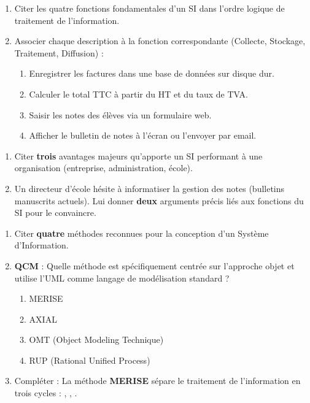 \documentclass[11pt]{article}
\begin{document}
\begin{exercice}[Fonctions d'un SI]
\begin{enumerate}
    \item Citer les quatre fonctions fondamentales d'un SI dans l'ordre logique de traitement de l'information.
    \item Associer chaque description à la fonction correspondante (Collecte, Stockage, Traitement, Diffusion) :
    \begin{enumerate}
        \item Enregistrer les factures dans une base de données sur disque dur.
        \item Calculer le total TTC à partir du HT et du taux de TVA.
        \item Saisir les notes des élèves via un formulaire web.
        \item Afficher le bulletin de notes à l'écran ou l'envoyer par email.
    \end{enumerate}
\end{enumerate}
\end{exercice}

\begin{exercice}[Intérêts d'un SI]
\begin{enumerate}
    \item Citer \textbf{trois} avantages majeurs qu'apporte un SI performant à une organisation (entreprise, administration, école).
    \item Un directeur d'école hésite à informatiser la gestion des notes (bulletins manuscrits actuels). Lui donner \textbf{deux} arguments précis liés aux fonctions du SI pour le convaincre.
\end{enumerate}
\end{exercice}

\begin{exercice}
\begin{enumerate}
    \item Citer \textbf{quatre} méthodes reconnues pour la conception d'un Système d'Information.
    \item \textbf{QCM} : Quelle méthode est spécifiquement centrée sur l'approche objet et utilise l'UML comme langage de modélisation standard ?
    \begin{enumerate}
        \item MERISE
        \item AXIAL
        \item OMT (Object Modeling Technique)
        \item RUP (Rational Unified Process)
    \end{enumerate}
    \item Compléter : La méthode \textbf{MERISE} sépare le traitement de l'information en trois cycles : \underline{\hspace{3cm}}, \underline{\hspace{3cm}}, \underline{\hspace{3cm}}.
\end{enumerate}
\end{exercice}
\end{document}
